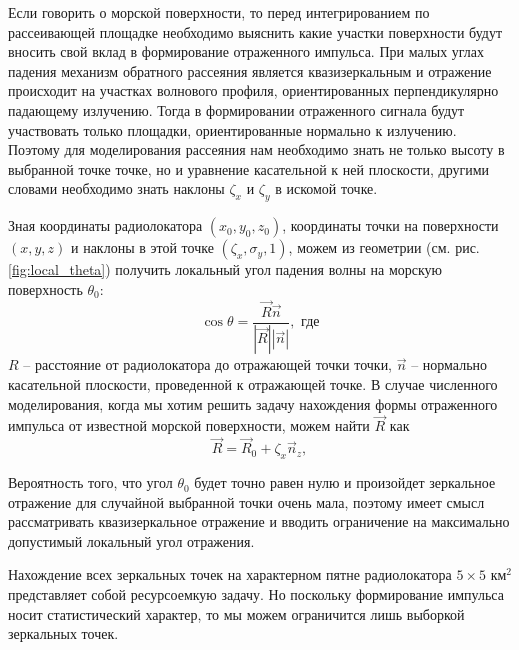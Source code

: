 Если говорить о морской поверхности, то перед интегрированием по рассеивающей
площадке необходимо выяснить какие участки поверхности будут вносить свой вклад
в формирование отраженного импульса.  При малых углах падения механизм обратного  рассеяния является квазизеркальным и отражение происходит на участках волнового профиля, ориентированных
перпендикулярно падающему излучению. Тогда в формировании отраженного сигнала
будут участвовать только площадки, ориентированные нормально к излучению. 
Поэтому для моделирования рассеяния нам необходимо знать не только высоту
в выбранной точке точке, но и уравнение касательной к ней плоскости, другими словами необходимо знать наклоны $\zeta_x$ и  $\zeta_y$ в искомой точке.


Зная координаты радиолокатора  $(x_0,y_0,z_0)$, координаты точки на
поверхности $(x,y,z)$ и наклоны в этой точке $(\zeta_x,\sigma_y,1)$, можем из
геометрии (см. рис. \ref{fig:local_theta}) получить локальный угол падения
волны на морскую поверхность $\theta_0$:
\begin{equation}
    \label{eq:local_theta}
    \cos \theta =  \frac{\vec R \vec n}{|\vec R| |\vec n|}, \text{ где}
\end{equation}
$R$ -- расстояние от радиолокатора до отражающей точки точки,
 $\vec n$ -- нормально касательной плоскости, проведенной к отражающей точке.
 В случае численного моделирования, когда мы хотим решить задачу нахождения
 формы отраженного импульса от известной морской поверхности, можем найти
 $\vec R$ как
 \begin{equation}
     \label{eq:R_1}
     \vec R = \vec R_0 + \zeta_x \vec n_z,
 \end{equation}




Вероятность того, что угол $\theta_0$ будет точно равен нулю и произойдет
зеркальное отражение для случайной выбранной точки очень мала, поэтому имеет
смысл рассматривать квазизеркальное отражение и вводить ограничение на
максимально допустимый локальный угол отражения. 

Нахождение всех зеркальных точек на характерном пятне радиолокатора  $5\times
5 \text{ км}^2$ представляет собой ресурсоемкую задачу. Но поскольку формирование
импульса носит статистический характер, то мы можем ограничится лишь выборкой зеркальных точек. 





